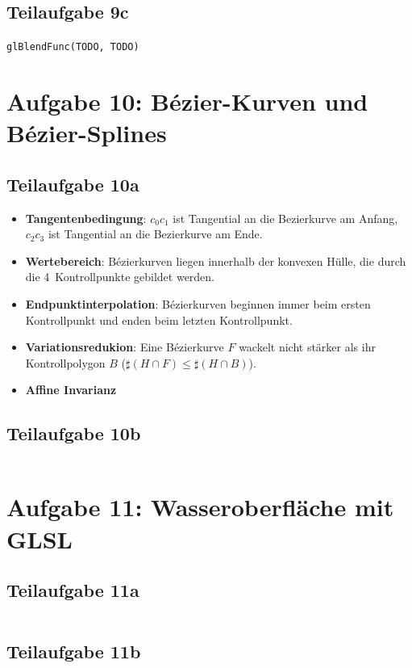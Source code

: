 \documentclass[a4paper]{scrartcl}
\begin{document}
\subsection*{Teilaufgabe 9c}
\texttt{glBlendFunc(TODO, TODO)}


\section*{Aufgabe 10: Bézier-Kurven und Bézier-Splines}
\subsection*{Teilaufgabe 10a}

\begin{itemize}
    \item \textbf{Tangentenbedingung}:
          $c_0 c_1$ ist Tangential an die Bezierkurve am Anfang,
          $c_2 c_3$ ist Tangential an die Bezierkurve am Ende.
    \item \textbf{Wertebereich}: Bézierkurven liegen innerhalb der konvexen
          Hülle, die durch die 4~Kontrollpunkte gebildet werden.
    \item \textbf{Endpunktinterpolation}: Bézierkurven beginnen immer beim
          ersten Kontrollpunkt und enden beim letzten Kontrollpunkt.
    \item \textbf{Variationsredukion}: Eine Bézierkurve $F$ wackelt nicht stärker
          als ihr Kontrollpolygon $B$ ($\sharp (H \cap F) \leq \sharp (H \cap B)$).
    \item \textbf{Affine Invarianz}
\end{itemize}

\clearpage
\subsection*{Teilaufgabe 10b}
\inputminted[linenos, numbersep=5pt, tabsize=4, frame=lines, label=shader.vert]{glsl}{shader.vert}

\clearpage
\section*{Aufgabe 11: Wasseroberfläche mit GLSL}
\subsection*{Teilaufgabe 11a}
\inputminted[linenos, numbersep=5pt, tabsize=4, frame=lines, label=shader.frag]{glsl}{shader.frag}

\clearpage
\subsection*{Teilaufgabe 11b}
\inputminted[linenos, numbersep=5pt, tabsize=4, frame=lines, label=shader.frag]{glsl}{shaderb.frag}
\end{document}
